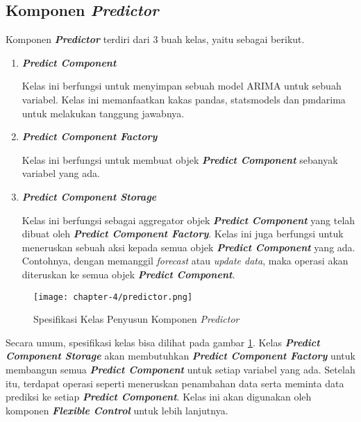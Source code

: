 \subsection{Komponen \textit{Predictor}}
Komponen \textbf{\textit{Predictor}} terdiri dari 3 buah kelas, yaitu sebagai berikut.
\begin{enumerate}
    \item \textbf{\textit{Predict Component}}
    
    Kelas ini berfungsi untuk menyimpan sebuah model ARIMA untuk sebuah variabel. Kelas ini memanfaatkan kakas pandas, statsmodels dan pmdarima untuk melakukan tanggung jawabnya.

    \item \textbf{\textit{Predict Component Factory}}
    
    Kelas ini berfungsi untuk membuat objek \textbf{\textit{Predict Component}} sebanyak variabel yang ada. 

    \item \textbf{\textit{Predict Component Storage}}
    
    Kelas ini berfungsi sebagai aggregator objek \textbf{\textit{Predict Component}} yang telah dibuat oleh \textbf{\textit{Predict Component Factory}}. Kelas ini juga berfungsi untuk meneruskan sebuah aksi kepada semua objek \textbf{\textit{Predict Component}} yang ada. Contohnya, dengan memanggil \textit{forecast} atau \textit{update data}, maka operasi akan diteruskan ke semua objek \textbf{\textit{Predict Component}}.

\end{enumerate}

\begin{figure}[h]
    \centering
    \texttt{[image: chapter-4/predictor.png]}
    \caption{Spesifikasi Kelas Penyusun Komponen \textit{Predictor}}
    \label{fig:predictor-spek}
\end{figure}

Secara umum, spesifikasi kelas bisa dilihat pada gambar \ref{fig:predictor-spek}. Kelas \textbf{\textit{Predict Component Storage}} akan membutuhkan \textbf{\textit{Predict Component Factory}} untuk membangun semua \textbf{\textit{Predict Component}} untuk setiap variabel yang ada. Setelah itu, terdapat operasi seperti meneruskan penambahan data serta meminta data prediksi ke setiap \textbf{\textit{Predict Component}}. Kelas ini akan digunakan oleh komponen \textbf{\textit{Flexible Control}} untuk lebih lanjutnya.

